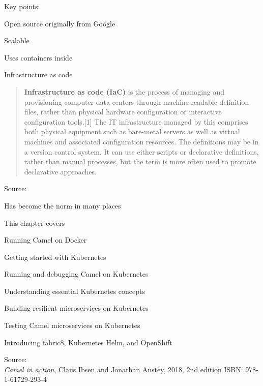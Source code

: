 \documentclass[Screen16to9,17pt]{foils}
\begin{document}
Key points:
\begin{list2}
\item Open source originally from Google
\item Scalable
\item Uses containers inside
\item Infrastructure as code
\end{list2}




\begin{quote}
{\bf Infrastructure as code (IaC)} is the process of managing and provisioning computer data centers through machine-readable definition files, rather than physical hardware configuration or interactive configuration tools.[1] The IT infrastructure managed by this comprises both physical equipment such as bare-metal servers as well as virtual machines and associated configuration resources. The definitions may be in a version control system. It can use either scripts or declarative definitions, rather than manual processes, but the term is more often used to promote declarative approaches.
\end{quote}
Source: {\footnotesize
{}}

\begin{list2}
  \item Has become the norm in many places
\end{list2}





This chapter covers
\begin{list2}
\item Running Camel on Docker
\item Getting started with Kubernetes
\item Running and debugging Camel on Kubernetes
\item Understanding essential Kubernetes concepts
\item Building resilient microservices on Kubernetes
\item Testing Camel microservices on Kubernetes
\item Introducing fabric8, Kubernetes Helm, and OpenShift
\end{list2}

Source: {\footnotesize\\
\emph{Camel in action}, Claus Ibsen and Jonathan Anstey, 2018, 2nd edition
ISBN: 978-1-61729-293-4}
\end{document}
